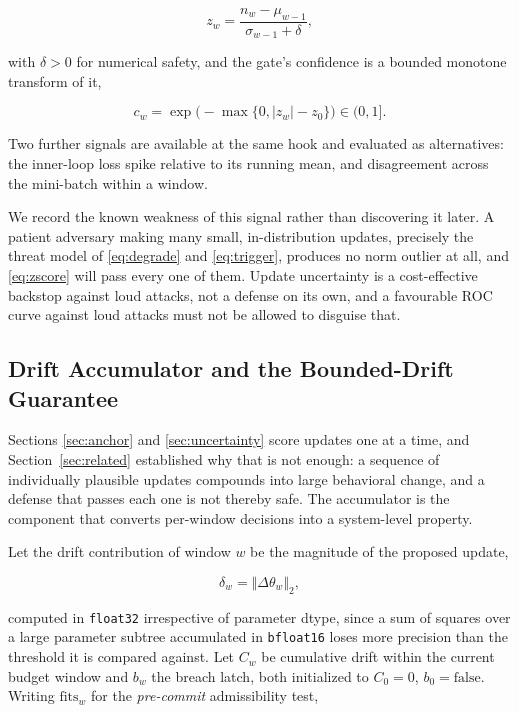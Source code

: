 \documentclass[journal]{IEEEtran}
\newcommand{\dtheta}{\Delta\theta}
\begin{document}
\begin{equation}
z_w = \frac{n_w - \mu_{w-1}}{\sigma_{w-1} + \delta},
\label{eq:zscore}
\end{equation}

with $\delta > 0$ for numerical safety, and the gate's confidence is a bounded
monotone transform of it,

\begin{equation}
c_w = \exp\!\big(-\max\{0, |z_w| - z_{0}\}\big) \in (0,1].
\label{eq:confidence}
\end{equation}

Two further signals are available at the same hook and evaluated as alternatives:
the inner-loop loss spike relative to its running mean, and disagreement across the
mini-batch within a window.

We record the known weakness of this signal rather than discovering it later. A
patient adversary making many small, in-distribution updates, precisely the
threat model of \eqref{eq:degrade} and \eqref{eq:trigger}, produces no norm
outlier at all, and \eqref{eq:zscore} will pass every one of them. Update
uncertainty is a cost-effective backstop against loud attacks, not a defense on its
own, and a favourable ROC curve against loud attacks must not be allowed to disguise
that.

\subsection{Drift Accumulator and the Bounded-Drift Guarantee}
\label{sec:drift}

Sections \ref{sec:anchor} and \ref{sec:uncertainty} score updates one at a time, and
Section~\ref{sec:related} established why that is not enough: a sequence of
individually plausible updates compounds into large behavioral change, and a defense
that passes each one is not thereby safe. The accumulator is the component that
converts per-window decisions into a system-level property.

Let the drift contribution of window $w$ be the magnitude of the proposed update,

\begin{equation}
\delta_w = \big\Vert \dtheta_w \big\Vert_{2},
\label{eq:driftdelta}
\end{equation}

computed in \texttt{float32} irrespective of parameter dtype, since a sum of squares
over a large parameter subtree accumulated in \texttt{bfloat16} loses more precision
than the threshold it is compared against. Let $C_w$ be cumulative drift within the
current budget window and $b_w$ the breach latch, both initialized to $C_0 = 0$,
$b_0 = \text{false}$. Writing $\mathrm{fits}_w$ for the \emph{pre-commit}
admissibility test,
\end{document}

